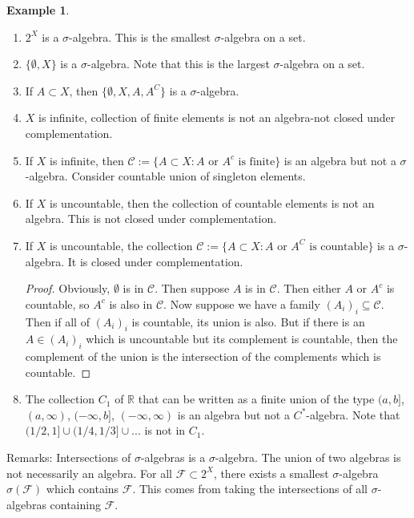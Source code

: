 \documentclass{article}
\theoremstyle{definition}
\newtheorem{example}[theorem]{Example}
\numberwithin{theorem}{section}
\numberwithin{equation}{section}
\begin{document}
\begin{example}
	\begin{enumerate}
		\item $2^X$ is a $\sigma$-algebra. This is the smallest $\sigma$-algebra on a set.
		\item $\lbrace \emptyset, X \rbrace$ is a $\sigma$-algebra. Note that this is the largest $\sigma$-algebra on a set.
		\item If $A \subset X$, then $\lbrace \emptyset, X, A, A^C \rbrace$ is a $\sigma$-algebra.
		\item $X$ is infinite, collection of finite elements is not an algebra-not closed under complementation. 
		\item If $X$ is infinite, then $\mathcal{C}:= \lbrace A \subset X : A \text{ or } A^c \text{ is finite} \rbrace$ is an algebra but not a $\sigma$-algebra. Consider countable union of singleton elements.
		\item If $X$ is uncountable, then the collection of countable elements is not an algebra. This is not closed under complementation.
		\item If $X$ is uncountable, the collection $\mathcal{C} := \lbrace A \subset X : A \text{ or } A^C \text{ is countable} \rbrace$ is a $\sigma$-algebra. It is closed under complementation.
		\begin{proof}
			Obviously, $\emptyset$ is in $\mathcal{C}$. Then suppose $A$ is in $\mathcal{C}$. Then either $A$ or $A^c$ is countable, so $A^c$ is also in $\mathcal{C}$. Now suppose we have a family $(A_i)_i \subseteq \mathcal{C}$. Then if all of $(A_i)_i$ is countable, its union is also. But if there is an $A \in (A_i)_i$ which is uncountable but its complement is countable, then the complement of the union is the intersection of the complements which is countable.
		\end{proof}
		\item The collection $C_1$ of $\mathbb{R}$ that can be written as a finite union of the type $(a, b]$, $(a, \infty)$, $(-\infty, b]$, $(-\infty, \infty)$ is an algebra but not a $C^*$-algebra. Note that $(1/2, 1] \cup (1/4, 1/3] \cup ...$ is not in $C_1$.
	\end{enumerate}
\end{example}

Remarks: Intersections of $\sigma$-algebras is a $\sigma$-algebra. The union of two algebras is not necessarily an algebra. For all $\mathcal{F} \subset 2^X$, there exists a smallest $\sigma$-algebra $\sigma(\mathcal{F})$ which contains $\mathcal{F}$. This comes from taking the intersections of all $\sigma$-algebras containing $\mathcal{F}$. 
\end{document}
